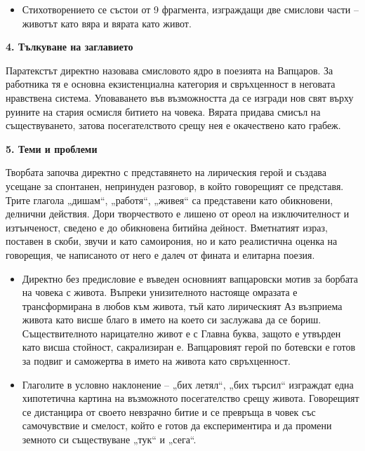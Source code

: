 \documentclass[12pt,a4paper]{article}
\begin{document}
\begin{itemize}[leftmargin=*]
\vspace{-0.2cm}
\item Стихотворението се състои от 9 фрагмента, изграждащи две смислови части – животът като вяра и вярата като живот.
\end{itemize}
 
\noindent 
\textbf{4. Тълкуване на заглавието}
\vspace{0.1cm}
 
\indent Паратекстът директно назовава смисловото ядро в поезията на Вапцаров. За работника тя е основна екзистенциална категория и свръхценност в неговата нравствена система. Уповаването във възможността да се изгради нов свят върху руините на стария осмисля битието на човека. Вярата придава смисъл на съществуването, затова посегателството срещу нея е окачествено като грабеж.

\vspace{0.1cm}

\noindent 
\textbf{5. Теми и проблеми}
\vspace{0.1cm}
 
\indent Творбата започва директно с представянето на лирическия герой и създава усещане за спонтанен, непринуден разговор, в който говорещият се представя. Трите глагола „дишам“, „работя“, „живея“ са представени като обикновени, делнични действия. Дори творчеството е лишено от ореол на изключителност и изтънченост, сведено е до обикновена битийна дейност. Вметнатият израз, поставен в скоби, звучи и като самоирония, но и като реалистична оценка на говорещия, че написаното от него е далеч от фината и елитарна поезия.

\begin{itemize}[leftmargin=*]
\vspace{-0.2cm}
\item Директно без предисловие е въведен основният вапцаровски мотив за борбата на човека с живота. Въпреки унизителното настояще омразата е трансформирана в любов към живота, тъй като лирическият Аз възприема живота като висше благо в името на което си заслужава да се бориш. \colorbox{yellow!40}{Съществителното нарицателно живот е с Главна буква}, защото е утвърден като висша стойност, сакрализиран е. Вапцаровият герой по ботевски е готов за подвиг и саможертва в името на живота като свръхценност.
\end{itemize}

\begin{itemize}[leftmargin=*]
\vspace{-0.6cm}
\item Глаголите в условно наклонение – „бих летял“, „бих търсил“ изграждат една хипотетична картина на възможното посегателство срещу живота. Говорещият се дистанцира от своето невзрачно битие и се превръща в човек със самочувствие и смелост, който е готов да експериментира и да промени земното си съществуване „тук“ и „сега“.
\end{itemize}
\end{document}

